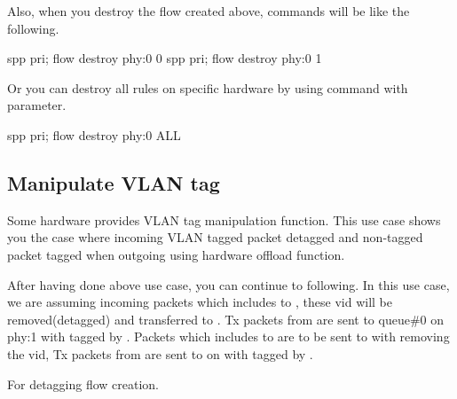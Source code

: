 \documentclass[a4paper,11pt,openany,oneside,english]{sphinxmanual}
\begin{document}
Also, when you destroy the flow created above, commands will be like the
following.

\begin{sphinxVerbatim}[commandchars=\\\{\},formatcom=\footnotesize]
spp \PYGZgt{} pri; flow destroy phy:0 0
spp \PYGZgt{} pri; flow destroy phy:0 1
\end{sphinxVerbatim}

Or you can destroy all rules on specific hardware
by using  command with  parameter.

\begin{sphinxVerbatim}[commandchars=\\\{\},formatcom=\footnotesize]
spp \PYGZgt{} pri; flow destroy phy:0 ALL
\end{sphinxVerbatim}


\subsection{Manipulate VLAN tag}
\label{\detokenize{usecases/hardware-offload:manipulate-vlan-tag}}
Some hardware provides VLAN tag manipulation function.
This use case shows you the case where incoming VLAN tagged packet detagged
and non-tagged packet tagged when outgoing using hardware offload function.

\begin{figure}[htbp]
\centering

\noindent{}
\end{figure}

After having done above use case, you can continue to following.
In this use case, we are assuming incoming packets which includes
 to , these vid will be removed(detagged) and
transferred to . Tx packets from  are sent to
queue\#0 on phy:1 with tagged by . Packets which includes
 to  are to be sent to  with removing
the vid,
Tx packets from  are sent to  on  with tagged
by .

For detagging flow creation.
\end{document}
